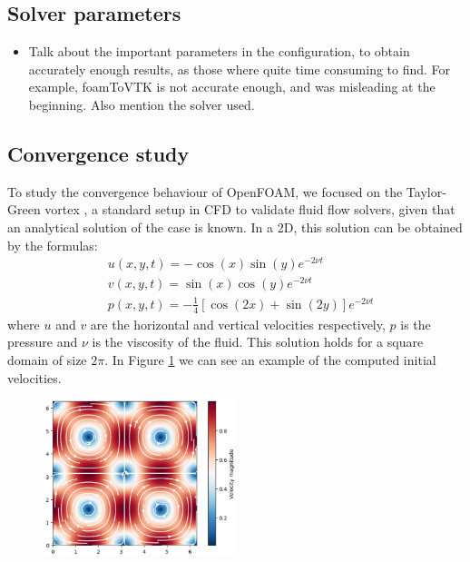 \documentclass[
  english,        %
  font=times,     %
  onecolumn,      %
]{tumarticle}
\begin{document}
\subsection{Solver parameters}
\begin{itemize}
    \item Talk about the important parameters in the configuration, to obtain accurately enough results, as those where quite time consuming to find. For example, foamToVTK is not accurate enough, and was misleading at the beginning. Also mention the solver used.
\end{itemize}

\subsection{Convergence study}

To study the convergence behaviour of OpenFOAM, we focused on the Taylor-Green vortex \cite{taylor1937mechanism, chorin1968numerical}, a standard setup in CFD to validate fluid flow solvers, given that an analytical solution of the case is known. In a 2D, this solution can be obtained by the formulas:
\begin{align}
    &u(x, y, t) = -\cos(x) \sin(y) e^{-2\nu t} \\
    &v(x, y, t) = \sin(x) \cos(y) e^{-2\nu t} \\
    &p(x, y, t) = -\frac{1}{4}\left[\cos(2x) + \sin(2y)\right]e^{-2\nu t}
\end{align}
where $u$ and $v$ are the horizontal and vertical velocities respectively, $p$ is the pressure and $\nu$ is the viscosity of the fluid. This solution holds for a square domain of size $2\pi$. In Figure \ref{fig:taylor-green} we can see an example of the computed initial velocities. 

\begin{figure}[!ht]
    \centering
    \includegraphics[width=0.5\textwidth]{resources/taylor-green-vortex.png}
    \caption{}
    \label{fig:taylor-green}
\end{figure}
\end{document}
